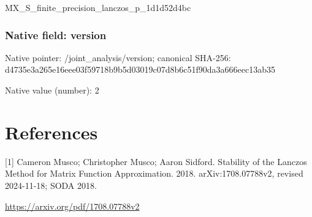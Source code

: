 \documentclass[10pt,a4paper]{article}
\begin{document}
\begingroup\raggedright\sloppy MX\_\allowbreak{}S\_\allowbreak{}finite\_\allowbreak{}precision\_\allowbreak{}lanczos\_\allowbreak{}p\_\allowbreak{}1d1d52d4bc\par\endgroup

\subsubsection{Native field: version}
Native pointer: /joint\_\allowbreak{}analysis/version; canonical SHA-256: d4735e3a265e16eee03f59718b9b5d03019c07d8b6c51f90da3a666eec13ab35

Native value (number): 2

\section{References}
[1] Cameron Musco; Christopher Musco; Aaron Sidford. Stability of the Lanczos Method for Matrix Function Approximation. 2018. arXiv:1708.07788v2, revised 2024-11-18; SODA 2018.

\url{https://arxiv.org/pdf/1708.07788v2}
\end{document}
